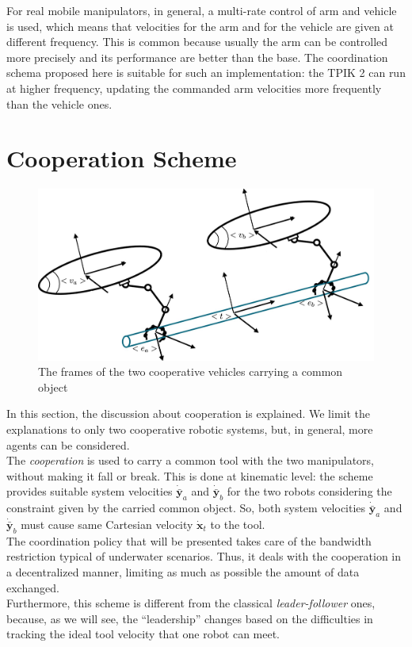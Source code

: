 For real mobile manipulators, in general, a multi-rate control of arm and vehicle is used, which means that velocities for the arm and for the vehicle are given at different frequency. This is common because usually the arm can be controlled more precisely and its performance are better than the base. The coordination schema proposed here is suitable for such an implementation: the TPIK 2 can run at higher frequency, updating the commanded arm velocities more frequently than the vehicle ones.

\section{Cooperation Scheme}
\label{sec:coopScheme}
\begin{figure}[H]
	\centerline{
		\includegraphics[width=0.8\columnwidth]{coopFrames.jpg}
	}
		\caption[Relevant frames for the cooperation scheme]{The frames of the two cooperative vehicles carrying a common object}\label{fig:coopFrames}
\end{figure}

In this section, the discussion about cooperation is explained. We limit the explanations to only two cooperative robotic systems, but, in general, more agents can be considered.\\

The \textit{cooperation} is used to carry a common tool with the two manipulators, without making it fall or break. This is done at kinematic level: the scheme provides suitable system velocities $\dot{\bar{\boldsymbol{y}}}_a$ and $\dot{\bar{\boldsymbol{y}}}_b$ for the two robots considering the constraint given by the carried common object. So, both system velocities $\dot{\bar{\boldsymbol{y}}}_a$ and $\dot{\bar{\boldsymbol{y}}}_b$ must cause same Cartesian velocity $\dot{{\boldsymbol{x}}}_t$ to the tool.\\
The coordination policy that will be presented takes care of the bandwidth restriction typical of underwater scenarios. Thus, it deals with the cooperation in a decentralized manner, limiting as much as possible the amount of data exchanged.\\
Furthermore, this scheme is different from the classical \textit{leader-follower} ones, because, as we will see, the \enquote{leadership} changes based on the difficulties in tracking the ideal tool velocity that one robot can meet.\\

